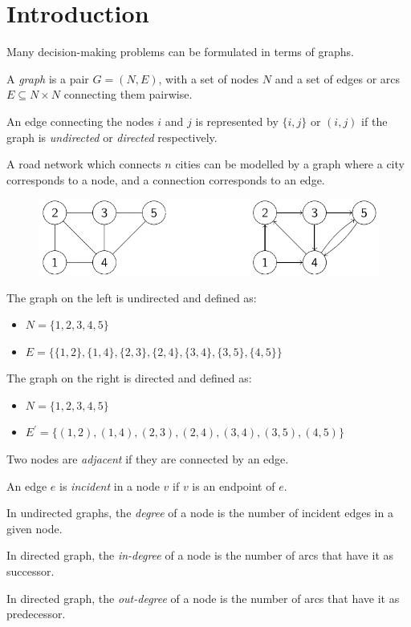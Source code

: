 \documentclass[12pt, a4paper]{report}
\begin{document}
    \section{Introduction}
    Many decision-making problems can be formulated in terms of graphs.
    \begin{definition}
        A \emph{graph} is a pair $G=(N,E)$, with a set of nodes $N$ and a set of edges or arcs $E \subseteq N \times N$ connecting them pairwise. 

        An edge connecting the nodes $i$ and $j$ is represented by $\{i,j\}$ or $(i,j)$ if the graph is \emph{undirected} or \emph{directed} respectively. 
    \end{definition}
    \begin{example}
        A road network which connects $n$ cities can be modelled by a graph where a city corresponds to a node, and a connection corresponds to an edge. 
        \begin{figure}[H]
            \centering
            \includegraphics[width=0.75\linewidth]{images/graph.png}
        \end{figure}
        The graph on the left is undirected and defined as: 
        \begin{itemize}
            \item $N=\{1,2,3,4,5\}$
            \item $E=\{\{1,2\},\{1,4\},\{2,3\},\{2,4\},\{3,4\},\{3,5\},\{4,5\}\}$
        \end{itemize}
        The graph on the right is directed and defined as: 
        \begin{itemize}
            \item $N=\{1,2,3,4,5\}$
            \item $E^{'}=\{(1,2),(1,4),(2,3),(2,4),(3,4),(3,5),(4,5)\}$
        \end{itemize}
    \end{example}
    \begin{definition}
        Two nodes are \emph{adjacent} if they are connected by an edge. 
        
        An edge $e$ is \emph{incident} in a node $v$ if $v$ is an endpoint of $e$. 
        
        In undirected graphs, the \emph{degree} of a node is the number of incident edges in a given node. 
        
        In directed graph, the \emph{in-degree} of a node is the number of arcs that have it as successor.
    
        In directed graph, the \emph{out-degree} of a node is the number of arcs that have it as predecessor.
    \end{definition}
\end{document}
